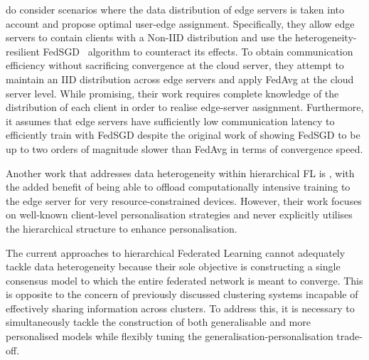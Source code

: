 \citet{OptimalUserEdgeAssingmentHierFL} do consider scenarios where the data distribution of edge servers is taken into account and propose optimal user-edge assignment. Specifically, they allow edge servers to contain clients with a Non-IID distribution and use the heterogeneity-resilient FedSGD~\citep{FedAvg} algorithm to counteract its effects. To obtain communication efficiency without sacrificing convergence at the cloud server, they attempt to maintain an IID distribution across edge servers and apply FedAvg at the cloud server level. While promising, their work requires complete knowledge of the distribution of each client in order to realise edge-server assignment. Furthermore, it assumes that edge servers have sufficiently low communication latency to efficiently train with FedSGD despite the original work of \citet{FedAvg} showing FedSGD to be up to two orders of magnitude slower than FedAvg in terms of convergence speed.

Another work that addresses data heterogeneity within hierarchical FL is \citet{PersonalisedFederatedLearningForIntelligentIoT}, with the added benefit of being able to offload computationally intensive training to the edge server for very resource-constrained devices. However, their work focuses on well-known client-level personalisation strategies and never explicitly utilises the hierarchical structure to enhance personalisation.

The current approaches to hierarchical Federated Learning cannot adequately tackle data heterogeneity because their sole objective is constructing a single consensus model to which the entire federated network is meant to converge. This is opposite to the concern of previously discussed clustering systems incapable of effectively sharing information across clusters. To address this, it is necessary to simultaneously tackle the construction of both generalisable and more personalised models while flexibly tuning the generalisation-personalisation trade-off.

